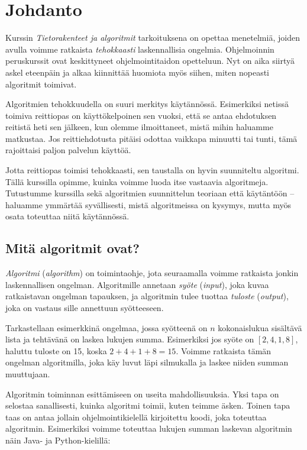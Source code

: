 \chapter{Johdanto}

Kurssin \emph{Tietorakenteet ja algoritmit} tarkoituksena
on opettaa menetelmiä, joiden avulla voimme ratkaista
\emph{tehokkaasti} laskennallisia ongelmia.
Ohjelmoinnin peruskurssit ovat keskittyneet
ohjelmointitaidon opetteluun.
Nyt on aika siirtyä askel eteenpäin ja alkaa kiinnittää
huomiota myös siihen, miten nopeasti algoritmit toimivat.

Algoritmien tehokkuudella on suuri merkitys käytännössä.
Esimerkiksi netissä toimiva reittiopas on käyttökelpoinen sen vuoksi,
että se antaa ehdotuksen reitistä heti sen jälkeen, kun olemme
ilmoittaneet, mistä mihin haluamme matkustaa.
Jos reittiehdotusta pitäisi odottaa vaikkapa minuutti tai tunti,
tämä rajoittaisi paljon palvelun käyttöä.

Jotta reittiopas toimisi tehokkaasti, sen taustalla on
hyvin suunniteltu algoritmi.
Tällä kurssilla opimme, kuinka voimme luoda itse vastaavia algoritmeja.
Tutustumme kurssilla sekä algoritmien suunnittelun teoriaan että
käytäntöön -- haluamme ymmärtää syvällisesti, mistä algoritmeissa on kysymys,
mutta myös osata toteuttaa niitä käytännössä.

\section{Mitä algoritmit ovat?}


\emph{Algoritmi} (\emph{algorithm}) on toimintaohje, jota seuraamalla voimme ratkaista
jonkin laskennallisen ongelman.
Algoritmille annetaan \emph{syöte} (\emph{input}),
joka kuvaa ratkaistavan ongelman tapauksen,
ja algoritmin tulee tuottaa \emph{tuloste} (\emph{output}),
joka on vastaus sille annettuun syötteeseen.

Tarkastellaan esimerkkinä ongelmaa,
jossa syötteenä on $n$ kokonaislukua sisältävä lista ja
tehtävänä on laskea lukujen summa.
Esimerkiksi jos syöte on $[2,4,1,8]$,
haluttu tuloste on 15, koska $2+4+1+8=15$.
Voimme ratkaista tämän ongelman algoritmilla,
joka käy luvut läpi silmukalla ja laskee niiden
summan muuttujaan.

Algoritmin toiminnan esittämiseen on useita mahdollisuuksia.
Yksi tapa on selostaa sanallisesti, kuinka algoritmi toimii,
kuten teimme äsken.
Toinen tapa taas on antaa jollain ohjelmointikielellä
kirjoitettu koodi, joka toteuttaa algoritmin.
Esimerkiksi voimme toteuttaa lukujen summan laskevan
algoritmin näin Java- ja Python-kielillä:

